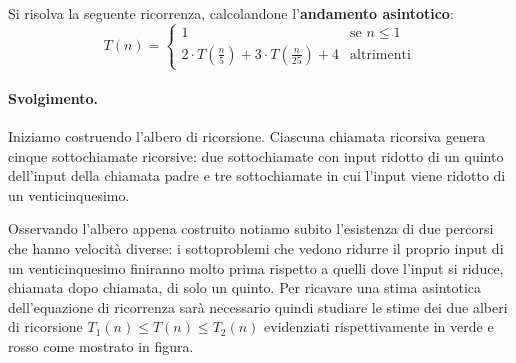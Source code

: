 \begin{exsbox}
	Si risolva la seguente ricorrenza, calcolandone l'\textbf{andamento asintotico}:
	\begin{displaymath}
		T(n) = \begin{cases}
			1 & \text{se } n \leq 1\\
			2 \cdot T(\frac{n}{5})+3 \cdot T(\frac{n}{25}) +4  & \text{altrimenti}
		\end{cases}
	\end{displaymath}
\end{exsbox}

\paragraph{Svolgimento.}
Iniziamo costruendo l'albero di ricorsione. Ciascuna chiamata ricorsiva genera cinque sottochiamate ricorsive: due sottochiamate con input ridotto di un quinto dell'input della chiamata padre e tre sottochiamate in cui l'input viene ridotto di un venticinquesimo.
\begin{center}
\end{center}
Osservando l'albero appena costruito notiamo subito l'esistenza di due percorsi che hanno velocità diverse: i sottoproblemi che vedono ridurre il proprio input di un venticinquesimo finiranno molto prima rispetto a quelli dove l'input si riduce, chiamata dopo chiamata, di solo un quinto. Per ricavare una stima asintotica dell'equazione di ricorrenza sarà necessario quindi studiare le stime dei due alberi di ricorsione $T_{1}(n) \leq T(n) \leq T_{2}(n)$ evidenziati rispettivamente in verde e rosso come mostrato in figura.
